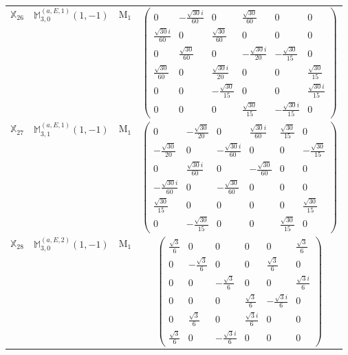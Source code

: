 \documentclass[fleqn,10pt,landscape]{article}
\begin{document}
\begin{itemize}
\begin{center}
\begin{longtable}{c|c|c|c}
$ \mathbb{X}_{26} $ & $\mathbb{M}_{3,0}^{(a,E,1)}(1,-1)$ & M$_{1}$ & $\begin{pmatrix} 0 & - \frac{\sqrt{30} i}{60} & 0 & \frac{\sqrt{30}}{60} & 0 & 0 \\ \frac{\sqrt{30} i}{60} & 0 & \frac{\sqrt{30}}{60} & 0 & 0 & 0 \\ 0 & \frac{\sqrt{30}}{60} & 0 & - \frac{\sqrt{30} i}{20} & - \frac{\sqrt{30}}{15} & 0 \\ \frac{\sqrt{30}}{60} & 0 & \frac{\sqrt{30} i}{20} & 0 & 0 & \frac{\sqrt{30}}{15} \\ 0 & 0 & - \frac{\sqrt{30}}{15} & 0 & 0 & \frac{\sqrt{30} i}{15} \\ 0 & 0 & 0 & \frac{\sqrt{30}}{15} & - \frac{\sqrt{30} i}{15} & 0 \end{pmatrix}$ \\
$ \mathbb{X}_{27} $ & $\mathbb{M}_{3,1}^{(a,E,1)}(1,-1)$ & M$_{1}$ & $\begin{pmatrix} 0 & - \frac{\sqrt{30}}{20} & 0 & \frac{\sqrt{30} i}{60} & \frac{\sqrt{30}}{15} & 0 \\ - \frac{\sqrt{30}}{20} & 0 & - \frac{\sqrt{30} i}{60} & 0 & 0 & - \frac{\sqrt{30}}{15} \\ 0 & \frac{\sqrt{30} i}{60} & 0 & - \frac{\sqrt{30}}{60} & 0 & 0 \\ - \frac{\sqrt{30} i}{60} & 0 & - \frac{\sqrt{30}}{60} & 0 & 0 & 0 \\ \frac{\sqrt{30}}{15} & 0 & 0 & 0 & 0 & \frac{\sqrt{30}}{15} \\ 0 & - \frac{\sqrt{30}}{15} & 0 & 0 & \frac{\sqrt{30}}{15} & 0 \end{pmatrix}$ \\
$ \mathbb{X}_{28} $ & $\mathbb{M}_{3,0}^{(a,E,2)}(1,-1)$ & M$_{1}$ & $\begin{pmatrix} \frac{\sqrt{3}}{6} & 0 & 0 & 0 & 0 & \frac{\sqrt{3}}{6} \\ 0 & - \frac{\sqrt{3}}{6} & 0 & 0 & \frac{\sqrt{3}}{6} & 0 \\ 0 & 0 & - \frac{\sqrt{3}}{6} & 0 & 0 & \frac{\sqrt{3} i}{6} \\ 0 & 0 & 0 & \frac{\sqrt{3}}{6} & - \frac{\sqrt{3} i}{6} & 0 \\ 0 & \frac{\sqrt{3}}{6} & 0 & \frac{\sqrt{3} i}{6} & 0 & 0 \\ \frac{\sqrt{3}}{6} & 0 & - \frac{\sqrt{3} i}{6} & 0 & 0 & 0 \end{pmatrix}$ \\

\end{longtable}
\end{center}
\end{itemize}
\end{document}
